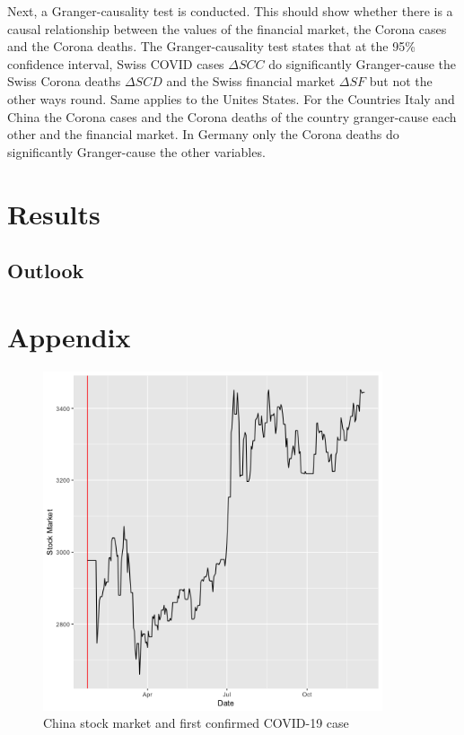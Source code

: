 \documentclass[11pt]{article}
\begin{document}
Next, a Granger-causality test is conducted. This should show whether there is a causal relationship between the values of the financial market, the Corona cases and the Corona deaths. The Granger-causality test states that at the 95\% confidence interval, Swiss COVID cases $\Delta SCC$ do significantly Granger-cause the Swiss Corona deaths $\Delta SCD$ and the Swiss financial market $\Delta SF$ but not the other ways round. Same applies to the Unites States. For the Countries Italy and China the Corona cases and the Corona deaths of the country granger-cause each other and the financial market. In Germany only the Corona deaths do significantly Granger-cause the other variables.

\section{Results}



\subsection{Outlook}


\clearpage
\section{Appendix}

\begin{figure}[h!]
\centering
  \includegraphics[width=100mm]{R-Code/plots/chinaFinance.png} 
  \caption{China stock market and first confirmed COVID-19 case}
  \label{china-covid-market}
\end{figure}
\end{document}

